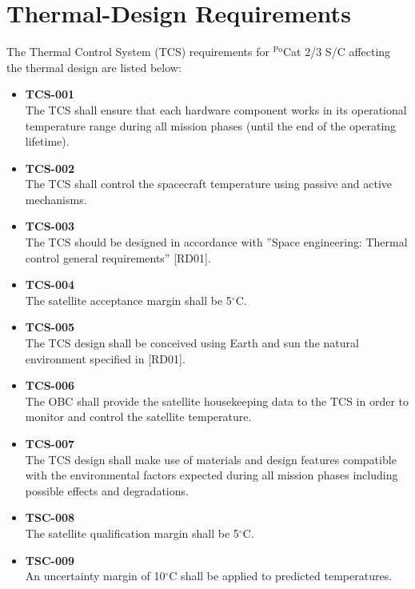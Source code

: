 \section{Thermal-Design Requirements}

The Thermal Control System (TCS) requirements for $^{\text{Po}}$Cat 2/3 S/C 
affecting the thermal design are listed below:

\begin{itemize}
    \item \textbf{TCS-001} \\
    The TCS shall ensure that each hardware component works in its operational
     temperature range during all mission phases (until the end of the operating
      lifetime).
    
    \item \textbf{TCS-002} \\
    The TCS shall control the spacecraft temperature using passive and active
     mechanisms.
    
    \item \textbf{TCS-003} \\
    The TCS should be designed in accordance with ''Space engineering: 
    Thermal control general requirements'' [RD01].
    
    \item \textbf{TCS-004} \\
    The satellite acceptance margin shall be 5$^\circ$C.
    
    \item \textbf{TCS-005} \\
    The TCS design shall be conceived using Earth and sun the natural 
    environment specified in [RD01].
    
    \item \textbf{TCS-006} \\
    The OBC shall provide the satellite housekeeping data to the TCS 
    in order to monitor and control the satellite temperature.
    
    \item \textbf{TCS-007} \\
    The TCS design shall make use of materials and design features 
    compatible with the environmental factors expected during all 
    mission phases including possible effects and degradations.
    
    \item \textbf{TSC-008} \\
    The satellite qualification margin shall be 5$^\circ$C.
    
    \item \textbf{TSC-009} \\
    An uncertainty margin of 10$^\circ$C shall be applied to 
    predicted temperatures.
\end{itemize}

